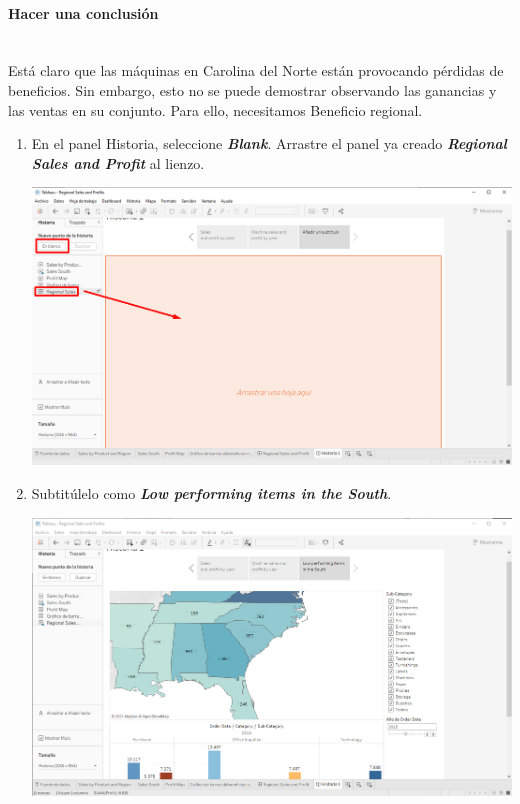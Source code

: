 \documentclass[12pt,letterpaper]{article}
\begin{document}
    \paragraph{\large Hacer una conclusión\\ \\}
    Está claro que las máquinas en Carolina del Norte están provocando pérdidas de beneficios. Sin embargo, esto no se puede demostrar observando las ganancias y las ventas en su conjunto. Para ello, necesitamos Beneficio regional.
    \begin{enumerate}
        \item En el panel Historia, seleccione \textit{\textbf{Blank}}. Arrastre el panel ya creado \textit{\textbf{Regional Sales and Profit}} al lienzo.
        \begin{center}
            \includegraphics[width=15cm]{./img/img93.png}
        \end{center}
        \item Subtitúlelo como \textit{\textbf{Low performing items in the South}}.
        \begin{center}
            \includegraphics[width=15cm]{./img/img94.png}

\end{center}
\end{enumerate}
\end{document}
